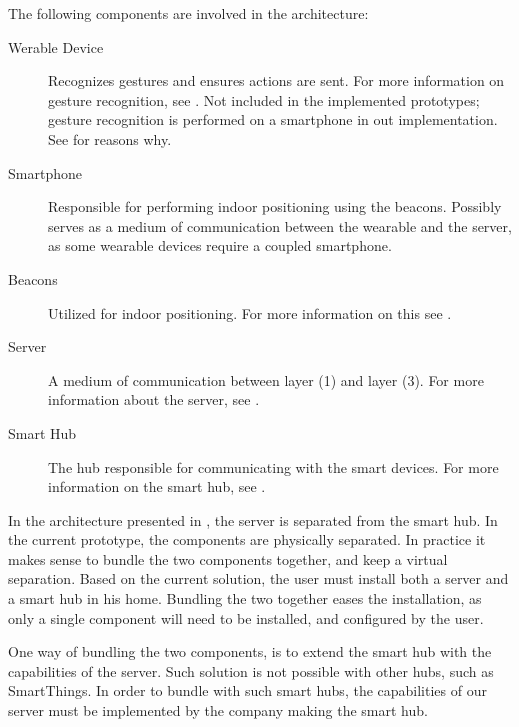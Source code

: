 The following components are involved in the architecture:
\begin{description}
    \item[Werable Device] Recognizes gestures and ensures actions are sent. For more information on gesture recognition, see . Not included in the implemented prototypes; gesture recognition is performed on a smartphone in out implementation. See  for reasons why. 
    \item[Smartphone] Responsible for performing indoor positioning using the beacons. Possibly serves as a medium of communication between the wearable and the server, as some wearable devices require a coupled smartphone.
    \item[Beacons] Utilized for indoor positioning. For more information on this see .
    \item[Server] A medium of communication between layer (1) and layer (3). For more information about the server, see .
    \item[Smart Hub] The hub responsible for communicating with the smart devices. For more information on the smart hub, see .
\end{description}

In the architecture presented in , 
the server is separated from the smart hub. 
In the current prototype, 
the components are physically separated. 
In practice it makes sense to bundle the two components together, 
and keep a virtual separation. 
Based on the current solution, 
the user must install both a server and a smart hub in his home. 
Bundling the two together eases the installation, 
as only a single component will need to be installed, 
and configured by the user.

One way of bundling the two components, 
is to extend the smart hub with the capabilities of the server.
Such solution is not possible with other hubs, such as SmartThings.
In order to bundle with such smart hubs, 
the capabilities of our server must be implemented by the company making the smart hub. 


